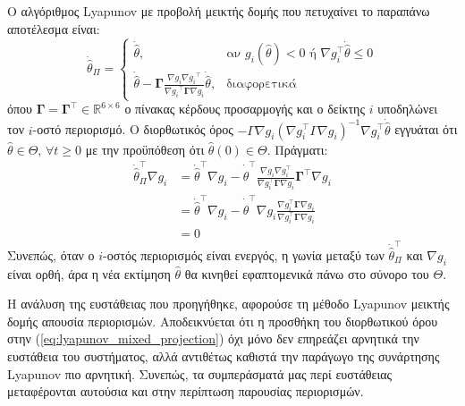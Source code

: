 \documentclass[a4paper,12pt]{article}
\begin{document}
Ο αλγόριθμος Lyapunov με προβολή μεικτής δομής που πετυχαίνει
το παραπάνω αποτέλεσμα είναι:
\begin{equation}
    \dot{\hat{\theta}}_\Pi = 
    \begin{cases}
    \dot{\hat{\theta}}, & \text{αν } g_i(\hat{\theta}) < 0 
    \text{ ή } \nabla g_i^\top \dot{\hat{\theta}} \leq 0 \\
    \dot{\hat{\theta}} - 
    \mathbf{\Gamma} \frac{\nabla g_i {\nabla g_i}^{\top}}{{\nabla g_i}^{\top} \mathbf{\Gamma} \nabla g_i}
    \dot{\hat{\theta}}, & \text{διαφορετικά}
    \end{cases}
    \label{eq:lyapunov_mixed_projection}
\end{equation}
όπου $\mathbf{\Gamma}  = \mathbf{\Gamma}^{\top} \in \mathbb{R}^{6 \times 6}$ ο πίνακας κέρδους προσαρμογής
και ο δείκτης $i$ υποδηλώνει τον $i$-οστό περιορισμό. Ο διορθωτικός όρος 
$- \Gamma \nabla g_i \left( \nabla g_i^\top \Gamma \nabla g_i \right)^{-1} \nabla g_i^\top 
\dot{\hat{\theta}}$ εγγυάται ότι $\hat{\theta} \in \Theta, \, \forall t \ge 0$ με την προϋπόθεση ότι
$\hat{\theta}(0) \in \Theta$. Πράγματι:
\[
\begin{aligned}
\dot{\hat{\theta}}_{\Pi}^{\top} \nabla g_i &= \dot{\hat{\theta}}^{\top} \nabla g_i - 
\dot{\hat{\theta}}^{\top} \frac{\nabla g_i \nabla g_i^{\top}}{\nabla g_i^{\top} \mathbf{\Gamma} \nabla g_i}
\mathbf{\Gamma}^{\top} \nabla g_i \\
&= \dot{\hat{\theta}}^{\top} \nabla g_i - \dot{\hat{\theta}}^{\top} \nabla g_i 
\frac{\nabla g_i^{\top} \mathbf{\Gamma} \nabla g_i}{\nabla g_i^{\top} \mathbf{\Gamma} \nabla g_i} \\
&= 0
\end{aligned}
\]
Συνεπώς, όταν ο $i$-οστός περιορισμός είναι ενεργός, η γωνία μεταξύ των $\dot{\hat{\theta}}_{\Pi}^{\top}$
και $\nabla g_i$ είναι ορθή, άρα η νέα εκτίμηση $\hat{\theta}$ θα κινηθεί εφαπτομενικά πάνω στο σύνορο του 
$\Theta$.

Η ανάλυση της ευστάθειας που προηγήθηκε, αφορούσε τη μέθοδο 
Lyapunov μεικτής δομής απουσία περιορισμών. Αποδεικνύεται 
ότι η προσθήκη του διορθωτικού όρου στην (\ref{eq:lyapunov_mixed_projection}) όχι μόνο δεν επηρεάζει 
αρνητικά την ευστάθεια του συστήματος, αλλά αντιθέτως καθιστά την παράγωγο της συνάρτησης 
Lyapunov πιο αρνητική. Συνεπώς, τα συμπεράσματά μας περί
ευστάθειας μεταφέρονται αυτούσια και στην περίπτωση παρουσίας περιορισμών.
\end{document}
